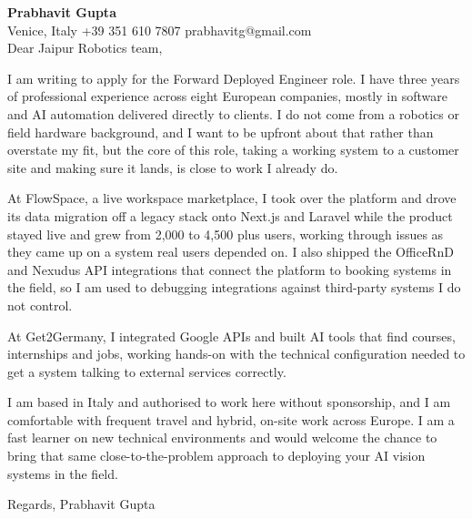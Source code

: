 \documentclass[a4paper,10.5pt]{article}
\begin{document}
\textbf{Prabhavit Gupta}\\
Venice, Italy \textbar{} +39 351 610 7807 \textbar{} prabhavitg@gmail.com\\[10pt]
Dear Jaipur Robotics team,

I am writing to apply for the Forward Deployed Engineer role. I have three years of professional experience across eight European companies, mostly in software and AI automation delivered directly to clients. I do not come from a robotics or field hardware background, and I want to be upfront about that rather than overstate my fit, but the core of this role, taking a working system to a customer site and making sure it lands, is close to work I already do.

At FlowSpace, a live workspace marketplace, I took over the platform and drove its data migration off a legacy stack onto Next.js and Laravel while the product stayed live and grew from 2,000 to 4,500 plus users, working through issues as they came up on a system real users depended on. I also shipped the OfficeRnD and Nexudus API integrations that connect the platform to booking systems in the field, so I am used to debugging integrations against third-party systems I do not control.

At Get2Germany, I integrated Google APIs and built AI tools that find courses, internships and jobs, working hands-on with the technical configuration needed to get a system talking to external services correctly.

I am based in Italy and authorised to work here without sponsorship, and I am comfortable with frequent travel and hybrid, on-site work across Europe. I am a fast learner on new technical environments and would welcome the chance to bring that same close-to-the-problem approach to deploying your AI vision systems in the field.

Regards,
Prabhavit Gupta
\end{document}
